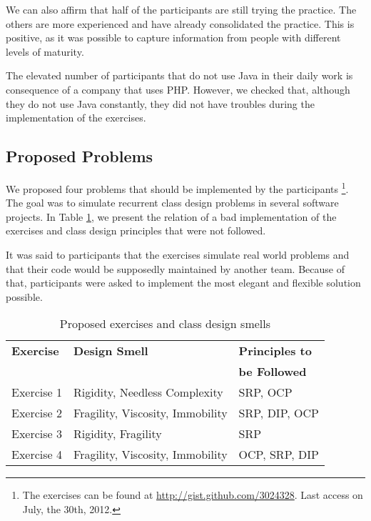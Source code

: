 \documentclass[times]{elsarticle}
\begin{document}
We can also affirm that half of the participants are still trying the practice. The others
are more experienced and have already consolidated the practice. This is positive, as it
was possible to capture information from people with different levels of maturity.

The elevated number of participants that do not use Java in their daily work is consequence
of a company that uses PHP. However, we checked that, although they do not use Java constantly,
they did not have troubles during the implementation of the exercises.

\subsection{Proposed Problems}
\label{sec:exercicios}

We proposed four problems that should be implemented by the participants
\footnote{The exercises can be found at \url{http://gist.github.com/3024328}. Last access on July, the 30th, 2012.}. 
The goal was to simulate recurrent class design problems in several software projects.
In Table \ref{tab:problemas-exercicios}, we present the relation of a bad implementation of
the exercises and class design principles that were not followed.

It was said to participants that the exercises simulate real world problems and that their code
would be supposedly maintained by another team. Because of that, participants were asked to
implement the most elegant and flexible solution possible.

\begin{table}
	\centering
	\begin{tabular}{| p{3cm} | p{6cm} | p{3cm} | }
		\hline
		\textbf{Exercise} & \textbf{Design Smell} & \textbf{Principles to}\\
		& & \textbf{be Followed}\\
		
		\hline
		
		Exercise 1 & Rigidity, Needless Complexity & SRP, OCP \\
		Exercise 2 & Fragility, Viscosity, Immobility & SRP, DIP, OCP \\
		Exercise 3 & Rigidity, Fragility & SRP\\
		Exercise 4 & Fragility, Viscosity, Immobility & OCP, SRP, DIP \\
		
		\hline
	\end{tabular}
	\caption{Proposed exercises and class design smells}
	\label{tab:problemas-exercicios}
\end{table}
\end{document}
